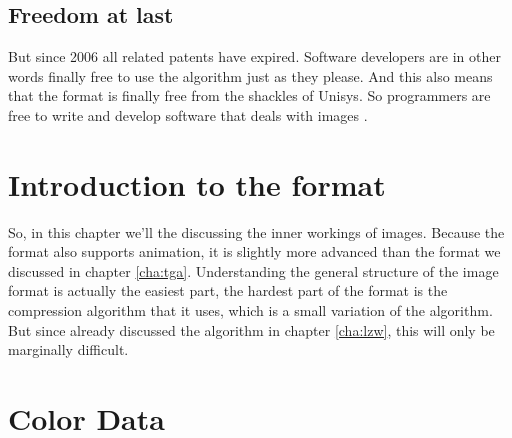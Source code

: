 \begin{refsection}
  \subsection{Freedom at last}

  But since 2006 all \lzw related patents have expired. Software
  developers are in other words finally free to use the \lzw algorithm
  just as they please. And this also means that the \gif format is
  finally free from the shackles of Unisys. So programmers are free to
  write and develop software that deals with \gif images \cite{caie:_sad}.

  \section{Introduction to the \gif format}

  So, in this chapter we'll the discussing the inner workings of \gif
  images. Because the \gif format also supports animation, it is
  slightly more advanced than the \tga format we discussed in chapter
  \ref{cha:tga}. Understanding the general structure of the image
  format is actually the easiest part, the hardest part of the format
  is the compression algorithm that it uses, which is a small
  variation of the \lzw algorithm. But since already discussed the \lzw
  algorithm in chapter \ref{cha:lzw}, this will only be marginally
  difficult. 
  
  \section{Color Data}

  \printbibliography[heading=  subbibliography]

\end{refsection}
